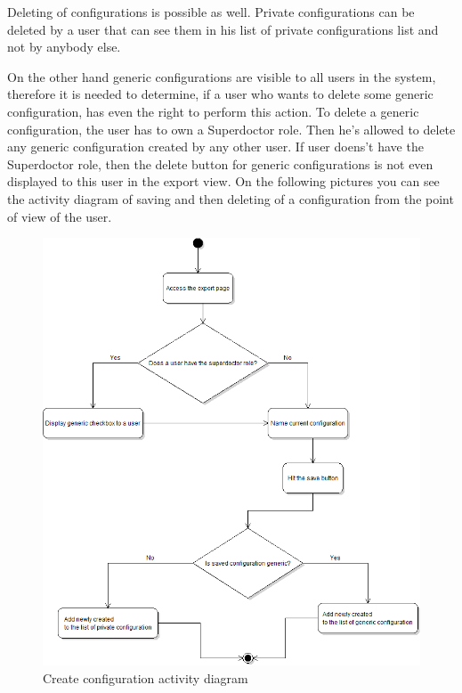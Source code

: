 \documentclass[thesis=B,english]{FITthesis}[2012/10/20]
\begin{document}
Deleting of configurations is possible as well. Private configurations can be deleted by a user that can see them in his list of private configurations list and not by anybody else. 

On the other hand generic configurations are visible to all users in the system, therefore it is needed to determine, if a user who wants to delete some generic configuration, has even the right to perform this action. To delete a generic configuration, the user has to own a Superdoctor role. Then he's allowed to delete any generic configuration created by any other user. If user doens't have the Superdoctor role, then the delete button for generic configurations is not even displayed to this user in the export view.
On the following pictures you can see the activity diagram of saving and then deleting of a configuration from the point of view of the user.
\begin{figure}[ht]\centering
\includegraphics[width=0.5\paperwidth]{createConfigurationDiagram}
		\caption{Create configuration activity diagram}
\end{figure}
\end{document}
